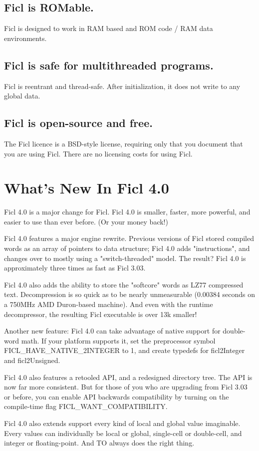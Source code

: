 \subsection{Ficl is \textbf{ROMable}.}
Ficl is designed to work in RAM based and ROM code / RAM data environments.
\subsection{Ficl is \textbf{safe for multithreaded programs}.}
Ficl is reentrant and thread-safe. After initialization, it does not
write to any global data.
\subsection{Ficl is \textbf{open-source and free}.}
The Ficl licence is a BSD-style license, requiring only that you
document that you are using Ficl. There are no licensing costs for using
Ficl.
\section{What's New In Ficl 4.0}
Ficl 4.0 is a major change for Ficl. Ficl 4.0 is smaller, faster, more
powerful, and easier to use than ever before. (Or your money back!)

Ficl 4.0 features a major engine rewrite. Previous versions of Ficl
stored compiled words as an array of pointers to data structure; Ficl
4.0 adds "instructions", and changes over to mostly using a
"switch-threaded" model. The result? Ficl 4.0 is approximately three
times as fast as Ficl 3.03.

Ficl 4.0 also adds the ability to store the "softcore" words as LZ77
compressed text. Decompression is so quick as to be nearly unmeasurable
(0.00384 seconds on a 750MHz AMD Duron-based machine). And even with the
runtime decompressor, the resulting Ficl executable is over 13k smaller!

Another new feature: Ficl 4.0 can take advantage of native support for
double-word math. If your platform supports it, set the preprocessor
symbol FICL\_HAVE\_NATIVE\_2INTEGER to 1, and create typedefs for
ficl2Integer and ficl2Unsigned.

Ficl 4.0 also features a retooled API, and a redesigned directory tree.
The API is now far more consistent. But for those of you who are
upgrading from Ficl 3.03 or before, you can enable API backwards
compatibility by turning on the compile-time flag FICL\_WANT\_COMPATIBILITY.

Ficl 4.0 also extends support every kind of local and global value
imaginable. Every values can individually be local or global, single-cell
or double-cell, and integer or floating-point. And TO always does the
right thing.

